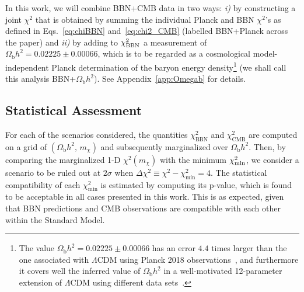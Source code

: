 \documentclass[notitlepage,letterpaper,natbib,aps,prd,onecolumn,amsmath,amsfonts,nofootinbib,preprintnumbers,superscriptaddress,secnumarabic,groupedaddress]{revtex4-1}
\begin{document}
In this work, we will combine BBN+CMB data in two ways: \textit{i)} by constructing a joint $\chi^2$ that is obtained by summing the individual Planck and BBN $\chi^2$'s as defined in Eqs.~\eqref{eq:chiBBN} and~\eqref{eq:chi2_CMB} (labelled BBN+Planck across the paper) and \textit{ii)} by adding to $\chi^2_{\rm BBN}$ a measurement of $\Omega_\mathrm{b} h^2 = 0.02225 \pm 0.00066$, which is to be regarded as a cosmological model-independent Planck determination of the baryon energy density\footnote{The value $\Omega_\mathrm{b} h^2 = 0.02225 \pm 0.00066$ has an error $4.4$ times larger than the one associated with $\Lambda\text{CDM}$ using Planck 2018 observations~\cite{Aghanim:2018eyx}, and furthermore it covers well the inferred value of $\Omega_\mathrm{b} h^2$ in a well-motivated 12-parameter extension of $\Lambda$CDM using different data sets~\cite{DiValentino:2016hlg,DiValentino:2017zyq}.} (we shall call this analysis BBN+$\Omega_\mathrm{b} h^2$). See Appendix~\ref{app:Omegab} for details.

\subsection{Statistical Assessment}\label{sec:Statistics}

For each of the scenarios considered, the quantities $\chi^2_\mathrm{BBN}$ and $\chi^2_\mathrm{CMB}$ are computed on a grid of $(\Omega_\mathrm{b} h^2,\,m_\chi)$ and subsequently marginalized over $\Omega_\mathrm{b} h^2$. Then, by comparing the marginalized 1-D $\chi^2 (m_\chi)$ with the minimum $\chi^2_{\rm min}$, we consider a scenario to be ruled out at $2\sigma$ when $\Delta \chi^2 \equiv \chi^2 - \chi^2_\mathrm{min} = 4$. The statistical compatibility of each ${\chi}^2_\mathrm{min}$ is estimated by computing its p-value, which is found to be acceptable in all cases presented in this work. This is as expected, given that BBN predictions and CMB observations are compatible with each other within the Standard Model.
\end{document}
